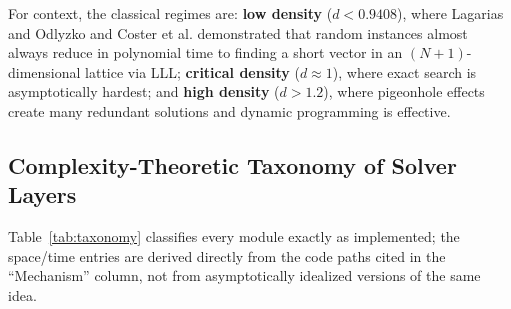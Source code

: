 \documentclass[journal,onecolumn,11pt]{IEEEtran}
\begin{document}
For context, the classical regimes are: \textbf{low density} ($d < 0.9408$), where Lagarias and Odlyzko \cite{lagarias1985solving} and Coster et al. \cite{coster1992improved} demonstrated that random instances almost always reduce in polynomial time to finding a short vector in an $(N{+}1)$-dimensional lattice via LLL; \textbf{critical density} ($d \approx 1$), where exact search is asymptotically hardest; and \textbf{high density} ($d>1.2$), where pigeonhole effects create many redundant solutions and dynamic programming is effective.

\subsection{Complexity-Theoretic Taxonomy of Solver Layers}
Table~\ref{tab:taxonomy} classifies every module exactly as implemented; the space/time entries are derived directly from the code paths cited in the ``Mechanism'' column, not from asymptotically idealized versions of the same idea.
\end{document}
